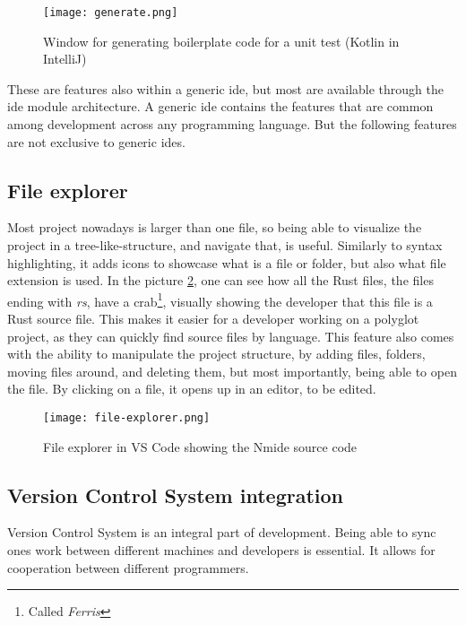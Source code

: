 \begin{figure}
  \centering
  \texttt{[image: generate.png]}
  \caption{
    Window for generating boilerplate code for a unit test (Kotlin in
    IntelliJ)
  }
  \label{pic:generate}
\end{figure}

These are features also within a generic \gls*{ide}, but most are available
through the \gls*{ide} module architecture. A generic \gls*{ide} contains the
features that are common among development across any programming language. But
the following features are not exclusive to generic \gls*{ide}s.

\subsection{File explorer}

Most project nowadays is larger than one file, so being able to visualize the
project in a tree-like-structure, and navigate that, is useful. Similarly to
syntax highlighting, it adds icons to showcase what is a file or folder, but
also what file extension is used. In the picture \ref{pic:fileEx}, one can see
how all the Rust files, the files ending with \textit{rs}, have a crab\footnote{Called \textit{Ferris}},
visually showing the developer that this file is a Rust source file. This makes
it easier for a developer working on a polyglot project, as they can quickly
find source files by language. This feature also comes with the ability to
manipulate the project structure, by adding files, folders, moving files around,
and deleting them, but most importantly, being able to open the file. By
clicking on a file, it opens up in an editor, to be edited.

\begin{figure}
  \centering
  \texttt{[image: file-explorer.png]}
  \caption{File explorer in VS Code showing the Nmide source code}
  \label{pic:fileEx}
\end{figure}

\subsection{Version Control System integration}

Version Control System is an integral part of development. Being able to sync
ones work between different machines and developers is essential. It allows for
cooperation between different programmers.

